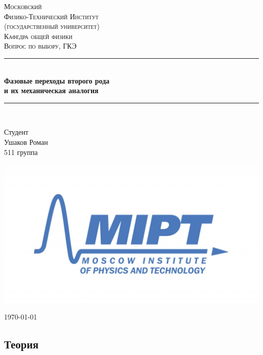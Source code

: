 \documentclass[a4paper, 12pt]{article}
\newenvironment{bottompar}{\par\vspace*{\fill}}{\clearpage}
\begin{document}
\begin{titlepage}
\newcommand{\HRule}{\rule{\linewidth}{0.5mm}} %

\center %
 
\textsc{\LARGE Московский\\[-0.2cm]Физико-Технический Институт\\[0.1cm]\large (государственный университет)}\\[1.5cm] %
\textsc{\Large Кафедра общей физики}\\[0.1cm] %
\textsc{\large Вопрос по выбору, ГКЭ}\\[0.5cm] %

\HRule
\\[0.8cm]
{ \huge \bfseries Фазовые переходы второго рода\\[0.3cm]  и их механическая аналогия}
\\[0.8cm] %
\HRule
\\[1.5cm]

\begin{flushleft} \large
	\textsf{Студент}\\[0.1cm]
	Ушаков Роман \\
	511 группа
\end{flushleft}

\begin{bottompar}
	\begin{center}
		\includegraphics[width = 80 mm]{logo.jpg}
	\end{center}
	{\large \today}

\end{bottompar}
\vfill
\end{titlepage}


\subsection*{Теория}
\end{document}
